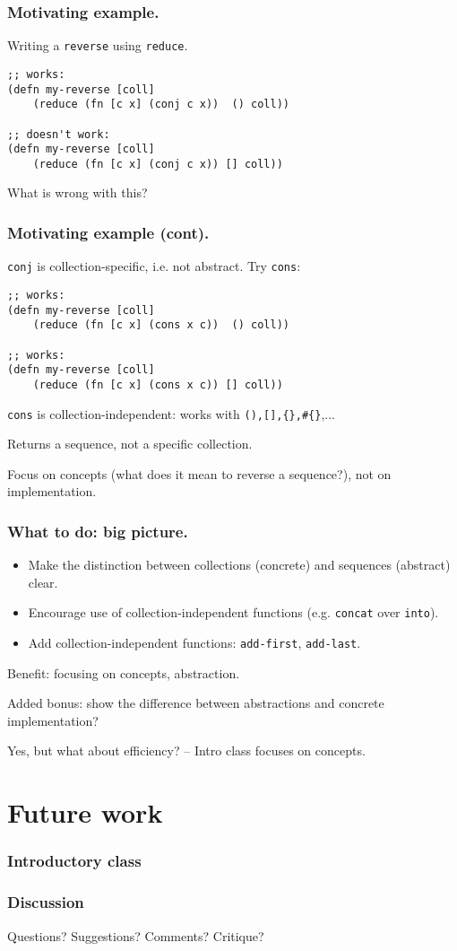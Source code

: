 \documentclass{beamer}
\begin{document}
\begin{frame}[fragile]
  \frametitle{Motivating example.}
Writing a {\tt reverse} using {\tt reduce}. 
\begin{verbatim}
;; works:
(defn my-reverse [coll]
    (reduce (fn [c x] (conj c x))  () coll)) 

;; doesn't work:
(defn my-reverse [coll]
    (reduce (fn [c x] (conj c x)) [] coll)) 
\end{verbatim}
What is wrong with this?
\end{frame}

\begin{frame}[fragile]
  \frametitle{Motivating example (cont).}
{\tt conj} is collection-specific, i.e. not abstract. Try {\tt cons}:

\begin{verbatim}
;; works:
(defn my-reverse [coll]
    (reduce (fn [c x] (cons x c))  () coll)) 

;; works:
(defn my-reverse [coll]
    (reduce (fn [c x] (cons x c)) [] coll)) 
\end{verbatim}
{\tt cons} is collection-independent: works with {\tt (),[],\{\},\#\{\}},...

Returns a sequence, not a specific collection. 

Focus on concepts (what does it mean to reverse a sequence?), not on implementation. 
\end{frame}

\begin{frame}[fragile]
  \frametitle{What to do: big picture.}
\begin{itemize}
\item Make the distinction between collections (concrete) and sequences (abstract) clear. 
\item Encourage use of collection-independent functions (e.g. {\tt concat} over {\tt into}).
\item Add collection-independent functions: {\tt add-first}, {\tt add-last}.
\end{itemize}
Benefit: focusing on concepts, abstraction. 

Added bonus: show the difference between abstractions and concrete implementation?

Yes, but what about efficiency? -- Intro class focuses on concepts. 
\end{frame}

\section{Future work}

\begin{frame}
  \frametitle{Introductory class}

\end{frame}



\begin{frame}
  \frametitle{Discussion}
Questions? Suggestions? Comments? Critique? 
\end{frame}
\end{document}
